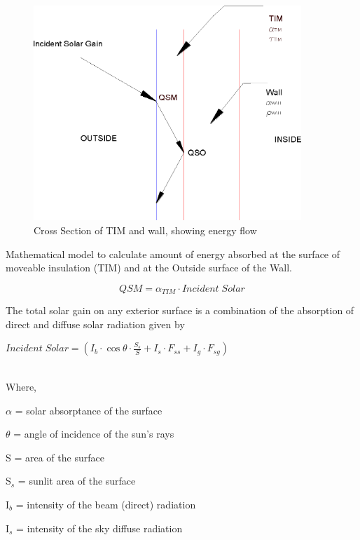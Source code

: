 \begin{figure}[hbtp] %
\centering
\includegraphics[width=0.9\textwidth, height=0.9\textheight, keepaspectratio=true]{media/image401.png}
\caption{  Cross Section of TIM and wall, showing energy flow \protect \label{fig:cross-section-of-tim-and-wall-showing-energy}}
\end{figure}

Mathematical model to calculate amount of energy absorbed at the surface of moveable insulation (TIM) and at the Outside surface of the Wall.

\begin{equation}
QSM = {\alpha_{TIM}}\cdot Incident\;Solar
\end{equation}

The total solar gain on any exterior surface is a combination of the absorption of direct and diffuse solar radiation given by

\textbf{\emph{\(Incident\;Solar = ({I_b}\cdot \cos \theta \cdot \frac{{{S_s}}}{S} + {I_s}\cdot {F_{ss}} + {I_g}\cdot {F_{sg}})\) ~~~~~~~~~~~~~~~~~~~~~~~~~~~~~~~~~~~~~~}}

Where,

$\alpha$ = solar absorptance of the surface

$\theta$ = angle of incidence of the sun's rays

S = area of the surface

S\(_{s}\) = sunlit area of the surface

I\(_{b}\) = intensity of the beam (direct) radiation

I\(_{s}\) = intensity of the sky diffuse radiation

